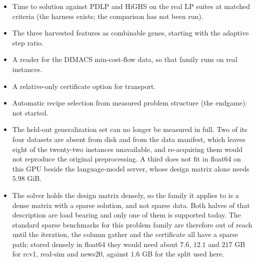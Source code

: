 \begin{itemize}
\item Time to solution against PDLP and HiGHS on the real LP suites at
  matched criteria (the harness exists; the comparison has not been run).
\item The three harvested features as combinable genes, starting with the
  adaptive step ratio.
\item A reader for the DIMACS min-cost-flow data, so that family runs on
  real instances.
\item A relative-only certificate option for transport.
\item Automatic recipe selection from measured problem structure (the
  endgame): not started.
\item The held-out generalization set can no longer be measured in full. Two of its
  four datasets are absent from disk and from the data manifest, which leaves eight
  of the twenty-two instances unavailable, and re-acquiring them would not reproduce
  the original preprocessing. A third does not fit in float64 on this GPU beside the
  language-model server, whose design matrix alone needs $5.98$ GiB.
\item The solver holds the design matrix densely, so the family it applies to is a
  dense matrix with a sparse solution, and not sparse data. Both halves of that
  description are load bearing and only one of them is supported today. The standard
  sparse benchmarks for this problem family are therefore out of reach until the
  iteration, the column gather and the certificate all have a sparse path: stored
  densely in float64 they would need about $7.6$, $12.1$ and $217$ GB for rcv1,
  real-sim and news20, against $1.6$ GB for the split used here.
\end{itemize}
